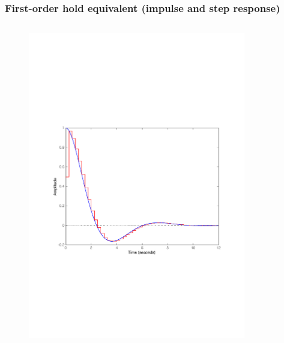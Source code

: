 \begin{frame}
	\frametitle{First-order hold equivalent (impulse and step response)}
	\vspace{-0.7em}
	\begin{columns}
		\begin{column}{0.5\textwidth}
			\begin{figure}
				\centering
				\includegraphics[width=1\linewidth]{vb2I}
			\end{figure}
		\end{column}
		\begin{column}{0.5\textwidth}
			\begin{figure}
				\centering

\end{figure}
\end{column}
\end{columns}
\end{frame}
